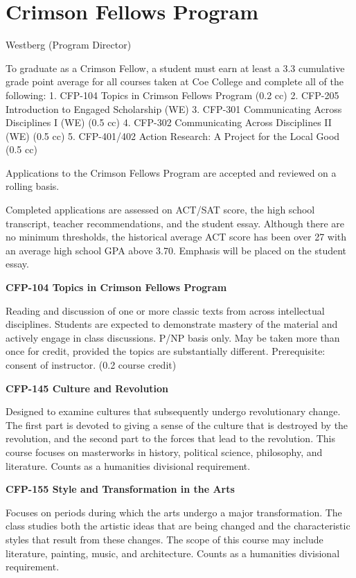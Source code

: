 \documentclass[
  letterpaper,
]{scrbook}
\begin{document}
\section{Crimson Fellows Program}\label{crimson-fellows-program}

Westberg (Program Director)

To graduate as a Crimson Fellow, a student must earn at least a 3.3
cumulative grade point average for all courses taken at Coe College and
complete all of the following: 1. CFP-104 Topics in Crimson Fellows
Program (0.2 cc) 2. CFP-205 Introduction to Engaged Scholarship (WE) 3.
CFP-301 Communicating Across Disciplines I (WE) (0.5 cc) 4. CFP-302
Communicating Across Disciplines II (WE) (0.5 cc) 5. CFP-401/402 Action
Research: A Project for the Local Good (0.5 cc)

Applications to the Crimson Fellows Program are accepted and reviewed on
a rolling basis.

Completed applications are assessed on ACT/SAT score, the high school
transcript, teacher recommendations, and the student essay. Although
there are no minimum thresholds, the historical average ACT score has
been over 27 with an average high school GPA above 3.70. Emphasis will
be placed on the student essay.

\textbf{CFP-104 Topics in Crimson Fellows Program}

Reading and discussion of one or more classic texts from across
intellectual disciplines. Students are expected to demonstrate mastery
of the material and actively engage in class discussions. P/NP basis
only. May be taken more than once for credit, provided the topics are
substantially different. Prerequisite: consent of instructor. (0.2
course credit)

\textbf{CFP-145 Culture and Revolution}

Designed to examine cultures that subsequently undergo revolutionary
change. The first part is devoted to giving a sense of the culture that
is destroyed by the revolution, and the second part to the forces that
lead to the revolution. This course focuses on masterworks in history,
political science, philosophy, and literature. Counts as a humanities
divisional requirement.

\textbf{CFP-155 Style and Transformation in the Arts}

Focuses on periods during which the arts undergo a major transformation.
The class studies both the artistic ideas that are being changed and the
characteristic styles that result from these changes. The scope of this
course may include literature, painting, music, and architecture. Counts
as a humanities divisional requirement.
\end{document}
